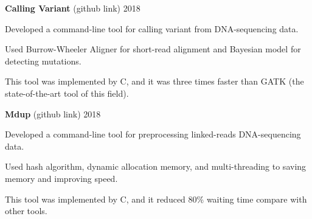 

\begin{cventries}

  \cventry
    {\textbf{Calling Variant} (github link)} %
    {}
    {}
    {2018} %
    {
      \begin{cvitems} %
        \item {Developed a command-line tool for calling variant from DNA-sequencing data.}
        \item {Used Burrow-Wheeler Aligner for short-read alignment and Bayesian model for detecting mutations.}
        \item {This tool was implemented by C, and it was three times faster than GATK (the state-of-the-art tool of this field).}
      \end{cvitems}
    }

  \cventry
    {\textbf{Mdup} (github link)} %
    {}
    {}
    {2018} %
    {
      \begin{cvitems} %
        \item {Developed a command-line tool for preprocessing linked-reads DNA-sequencing data.}
        \item {Used hash algorithm, dynamic allocation memory, and multi-threading to saving memory and improving speed.}
        \item {This tool was implemented by C, and it reduced 80\% waiting time compare with other tools.}
      \end{cvitems}
    }

\end{cventries}
